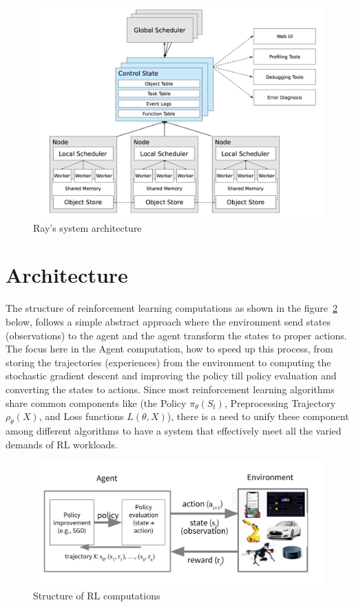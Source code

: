\begin{figure}[!htb]
	\centering
	\includegraphics[width=\linewidth]{figures/ray_arch.png}
	\caption{Ray's system architecture}
	\label{fig:ray_arch}
\end{figure}


\section{Architecture}

The structure of reinforcement learning computations as shown in the figure~\ref{fig:rl_computation} below, follows a simple abstract approach where the environment send states (observations) to the agent and the agent transform the states to proper actions. The focus here in the Agent computation, how to speed up this process, from storing the trajectories (experiences) from the environment to computing the stochastic gradient descent and improving the policy till policy evaluation and converting the states to actions. Since most reinforcement learning algorithms share common components like (the Policy \(\pi_{\theta}\left(S_{t}\right)\), Preprocessing Trajectory \(\rho_{\theta}(X)\), and Loss functions \(L(\theta, X)\)), there is a need to unify these component among different algorithms to have a system that effectively meet all the varied demands of RL workloads.
\begin{figure}[!htb]
	\centering
	\includegraphics[width=\linewidth]{figures/architecture/rl_computation.png}
	\caption[Structure of RL computations]{Structure of RL computations\footnotemark}
	\label{fig:rl_computation}
\end{figure}


